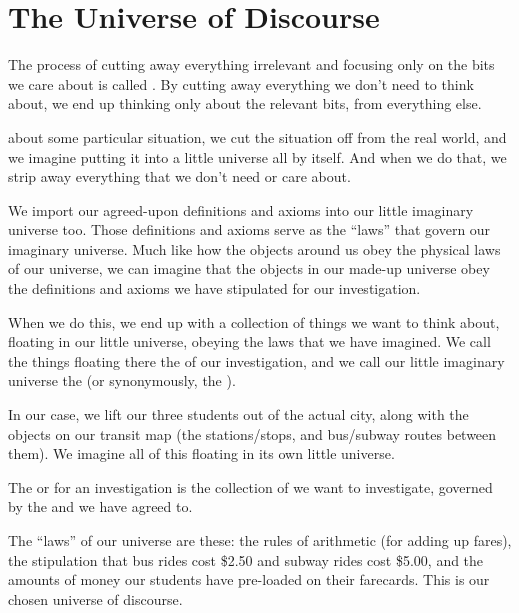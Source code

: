 \documentclass[../../../main.tex]{subfiles}
\begin{document}
\section{The Universe of Discourse}

\begin{terminology}
  The process of cutting away everything irrelevant and focusing only on the bits we care about is called . By cutting away everything we don't need to think about, we end up thinking only about the relevant bits,  from everything else.
\end{terminology}

 about some particular situation, we cut the situation off from the real world, and we imagine putting it into a little universe all by itself. And when we do that, we strip away everything that we don't need or care about.

We import our agreed-upon definitions and axioms into our little imaginary universe too. Those definitions and axioms serve as the ``laws'' that govern our imaginary universe. Much like how the objects around us obey the physical laws of our universe, we can imagine that the objects in our made-up universe obey the definitions and axioms we have stipulated for our investigation.

When we do this, we end up with a collection of things we want to think about, floating in our little universe, obeying the laws that we have imagined. We call the things floating there the  of our investigation, and we call our little imaginary universe the  (or synonymously, the ).

In our case, we lift our three students out of the actual city, along with the objects on our transit map (the stations/stops, and bus/subway routes between them). We imagine all of this floating in its own little universe.

\begin{terminology}
    The  or  for an investigation is the collection of  we want to investigate, governed by the  and  we have agreed to.
\end{terminology}

The ``laws'' of our universe are these: the rules of arithmetic (for adding up fares), the stipulation that bus rides cost \$2.50 and subway rides cost \$5.00, and the amounts of money our students have pre-loaded on their farecards. This is our chosen universe of discourse.
\end{document}
